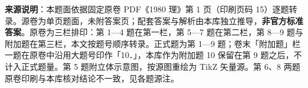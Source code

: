 


\begin{gktip}
\textbf{来源说明}：本题面依据固定原卷 PDF《1980 理》第 1 页（印刷页码 15）逐题转录。源卷为单页题面，未附答案页；配套答案与解析由本库独立推导，\textbf{非官方标准答案}。原卷为三栏排印：第 1—4 题在第一栏，第 5—7 题在第二栏，第 8—9 题与附加题在第三栏，本文按题号顺序转录。正式题为第 1—9 题；卷末「附加题」栏一题在原卷中沿用大题号印作「10．」，本库作为附加题 10 保留在第 9 题之后，不计入正式题量。第 5 题附立体示意图，按源图重绘为 TikZ 矢量源。第 6、8 两题原卷印刷与本库核对结论不一致，见各题源注。
\end{gktip}

